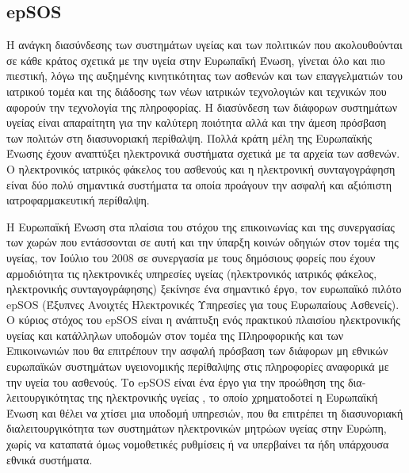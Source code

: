 	
	\subsection{epSOS}
	
		Η ανάγκη διασύνδεσης των συστημάτων υγείας και των πολιτικών που ακολουθούνται σε κάθε κράτος σχετικά με την υγεία στην Ευρωπαϊκή Ένωση, γίνεται όλο και πιο πιεστική, λόγω της αυξημένης κινητικότητας των ασθενών και των επαγγελματιών του ιατρικού τομέα και της διάδοσης των νέων ιατρικών τεχνολογιών και τεχνικών που αφορούν την τεχνολογία της πληροφορίας. Η διασύνδεση των διάφορων συστημάτων υγείας είναι απαραίτητη για την καλύτερη ποιότητα αλλά και την άμεση πρόσβαση των πολιτών στη διασυνοριακή περίθαλψη.  Πολλά κράτη μέλη της Ευρωπαϊκής Ένωσης έχουν αναπτύξει ηλεκτρονικά συστήματα σχετικά με τα αρχεία των ασθενών. Ο ηλεκτρονικός ιατρικός φάκελος του ασθενούς και η ηλεκτρονική συνταγογράφηση είναι δύο πολύ σημαντικά συστήματα τα οποία προάγουν την ασφαλή και αξιόπιστη ιατροφαρμακευτική περίθαλψη.	 	
	 	
	 	Η Ευρωπαϊκή Ένωση στα πλαίσια του στόχου της επικοινωνίας και της συνεργασίας των χωρών που εντάσσονται σε αυτή και την ύπαρξη κοινών οδηγιών στον τομέα της υγείας, τον Ιούλιο του 2008 σε συνεργασία με τους δημόσιους φορείς που έχουν αρμοδιότητα τις ηλεκτρονικές υπηρεσίες υγείας (ηλεκτρονικός ιατρικός φάκελος, ηλεκτρονικής συνταγογράφησης) ξεκίνησε ένα σημαντικό έργο, τον ευρωπαϊκό πιλότο epSOS (Έξυπνες Ανοιχτές Ηλεκτρονικές Υπηρεσίες για τους Ευρωπαίους Ασθενείς). Ο κύριος στόχος του epSOS είναι η ανάπτυξη ενός πρακτικού πλαισίου ηλεκτρονικής υγείας και κατάλληλων  υποδομών  στον τομέα της  Πληροφορικής και των Επικοινωνιών που θα επιτρέπουν την ασφαλή πρόσβαση των διάφορων μη εθνικών ευρωπαϊκών συστημάτων υγειονομικής περίθαλψης στις πληροφορίες αναφορικά με την υγεία του ασθενούς. Το epSOS είναι ένα έργο για την προώθηση της δια-λειτουργικότητας της ηλεκτρονικής υγείας , το οποίο χρηματοδοτεί η Ευρωπαϊκή Ένωση και θέλει να χτίσει μια υποδομή υπηρεσιών, που θα επιτρέπει  τη διασυνοριακή διαλειτουργικότητα των συστημάτων ηλεκτρονικών μητρώων υγείας στην Ευρώπη, χωρίς να καταπατά όμως νομοθετικές ρυθμίσεις ή να υπερβαίνει τα ήδη υπάρχουσα εθνικά συστήματα\cite{Dogac2012}.



